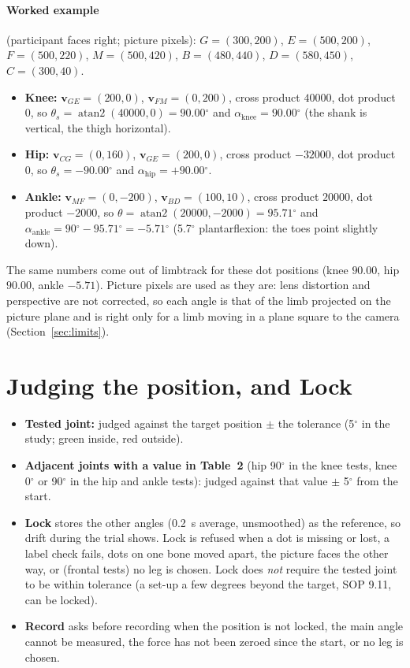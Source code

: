 \documentclass[a4paper,10pt]{article}
\newcommand{\lt}{\textsf{limbtrack}}
\newcommand{\dg}{\ensuremath{^\circ}}
\begin{document}
\paragraph{Worked example} (participant faces right; picture pixels): $G=(300,200)$, $E=(500,200)$, $F=(500,220)$, $M=(500,420)$,
$B=(480,440)$, $D=(580,450)$, $C=(300,40)$.
\begin{itemize}
\item \textbf{Knee:} $\mathbf{v}_{GE}=(200,0)$, $\mathbf{v}_{FM}=(0,200)$, cross product $40000$, dot product $0$, so
  $\theta_s=\operatorname{atan2}(40000,0)=90.00\dg$ and $\alpha_{\text{knee}}=90.00\dg$ (the shank is vertical, the thigh horizontal).
\item \textbf{Hip:} $\mathbf{v}_{CG}=(0,160)$, $\mathbf{v}_{GE}=(200,0)$, cross product $-32000$, dot product $0$, so $\theta_s=-90.00\dg$ and
  $\alpha_{\text{hip}}=+90.00\dg$.
\item \textbf{Ankle:} $\mathbf{v}_{MF}=(0,-200)$, $\mathbf{v}_{BD}=(100,10)$, cross product $20000$, dot product $-2000$, so
  $\theta=\operatorname{atan2}(20000,-2000)=95.71\dg$ and $\alpha_{\text{ankle}}=90\dg-95.71\dg=-5.71\dg$ (5.7\dg{} plantarflexion: the toes
  point slightly down).
\end{itemize}
\noindent The same numbers come out of \lt{} for these dot positions (knee $90.00$, hip $90.00$, ankle $-5.71$). Picture pixels are used as
they are: lens distortion and perspective are not corrected, so each angle is that of the limb projected on the picture plane and is
right only for a limb moving in a plane square to the camera (Section~\ref{sec:limits}).

\section{Judging the position, and Lock}
\begin{itemize}
\item \textbf{Tested joint:} judged against the target position $\pm$ the tolerance (5\dg{} in the study; green inside, red outside).
\item \textbf{Adjacent joints with a value in Table~2} (hip 90\dg{} in the knee tests, knee 0\dg{} or 90\dg{} in the hip and ankle tests):
  judged against that value $\pm$ 5\dg{} from the start.
\item \textbf{Lock} stores the other angles (0.2~s average, unsmoothed) as the reference, so drift during the trial shows. Lock is refused
  when a dot is missing or lost, a label check fails, dots on one bone moved apart, the picture faces the other way, or (frontal tests) no
  leg is chosen. Lock does \emph{not} require the tested joint to be within tolerance (a set-up a few degrees beyond the target, SOP 9.11,
  can be locked).
\item \textbf{Record} asks before recording when the position is not locked, the main angle cannot be measured, the force has not been
  zeroed since the start, or no leg is chosen.
\end{itemize}
\end{document}
